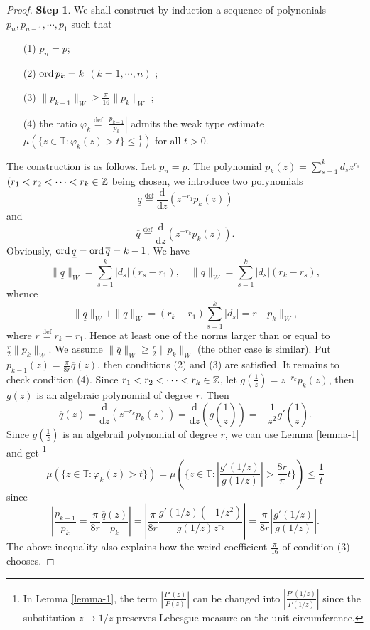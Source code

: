 \begin{proof}
 
  \textbf{Step 1}. We shall construct by induction a sequence of polynonials $p_n,p_{n-1},\cdots,p_1$ such that
  \begin{itemize}
    \item [(1)] $p_n=p$;
    \item [(2)]  $\operatorname{ord} p_k=k$ $ (k=1,\cdots,n)$ ;
    \item [(3)] $\|p_{k-1}\|_{W}\ge \frac{\pi}{16}\|p_k\|_{W}$ ;
    \item [(4)] the ratio $\varphi_k\overset{\mathrm{def}}{=}\left| \frac{p_{k-1}}{p_k} \right| $ admits the weak type estimate $\mu\left( \{z\in \mathbb{T}:\varphi_k(z)>t\} \le \frac{1}{t} \right) $ for all $t>0$.
  \end{itemize}
  The construction is as follows. Let $p_n=p$. The polynomial $p_k(z)=\sum_{s=1}^{k}d_sz^{r_s}$ $(r_1<r_2<\cdots<r_k\in \mathbb{Z}$ being chosen, we introduce two polynomials
  \[
    \underline{q}\overset{\mathrm{def}}{=} \frac{\mathrm{d}}{\mathrm{d}z}\left( z^{-r_1}p_k(z) \right) 		  
  \] 
  and
  \[
    \overline{q}\overset{\mathrm{def}}{=} \frac{\mathrm{d}}{\mathrm{d}z}\left( z^{-r_k}p_k(z) \right). 
  \] 
  Obviously, $\operatorname{ord} \underline{q}=\operatorname{ord} \overline{q}=k-1$. We have 
  \[
    \|\underline{q}\|_{W}=\sum_{s=1}^{k} \left| d_s \right| \left( r_s-r_1 \right) ,\quad \|\overline{q}\|_{W}=\sum_{s=1}^{k} \left| d_s \right| \left( r_k-r_s \right), 
  \] 
  whence
  \[
    \|\underline{q}\|_{W}+\|\overline{q}\|_{W}=\left( r_k-r_1 \right) \sum_{s=1}^{k} \left| d_s \right| =r\|p_k\|_{W},
  \] 
  where $r\overset{\mathrm{def}}{=}r_k-r_1$. Hence at least one of the norms larger than or equal to $\frac{r}{2}\|p_k\|_{W}$. We assume $\|\overline{q}\|_{W}\ge \frac{r}{2}\|p_k\|_{W}$ (the other case is similar). Put $p_{k-1}(z)=\frac{\pi}{8r}\overline{q}(z)$, then conditions (2) and (3) are satisfied. It remains to check condition (4). Since $r_1<r_2<\cdots<r_k\in \mathbb{Z}$, let $g(\frac{1}{z})=z^{-r_k}p_k(z)$, then $g(z)$ is an algebraic polynomial of degree $r$. Then
   \[
     \overline{q}(z)= \frac{\mathrm{d}}{\mathrm{d}z}\left( z^{-r_k}p_k(z) \right) = \frac{\mathrm{d}}{\mathrm{d}z}\left( g\left( \frac{1}{z} \right)  \right)=-\frac{1}{z^2}g'\left( \frac{1}{z} \right).	
\] 
Since $g\left( \frac{1}{z} \right) $ is an algebrail polynomial of degree $r$, we can use  Lemma \ref{lemma-1} and get \footnote{In Lemma \ref{lemma-1}, the term $\left| \frac{P'(z)}{P(z)} \right|$ can be changed into $\left| \frac{P'(1 /z)}{P(1 /z)} \right| $ since the substitution $z\mapsto 1 /z$ preserves Lebesgue measure on the unit circumference.  }
\begin{equation*}
    \mu \left( \{z\in \mathbb{T}:\varphi_{k}(z)>t\}  \right) = \mu \left( \{z\in \mathbb{T}:\left| \frac{g'(1 /z)}{g(1 /z)} \right| >\frac{8r}{\pi}t\}  \right) \le \frac{1}{t} 
\end{equation*} 
since 
$$\left|\frac{p_{k-1}}{p_k}=\frac{\pi}{8r} \frac{\overline{q}(z)}{p_k}\right|=\left|\frac{\pi}{8r} \frac{g'(1 /z)(-1 /z^2)}{g(1 /z)z^{r_k}}\right|=\frac{\pi}{8r}\left| \frac{g'(1 /z)}{g(1 /z)} \right|. 
$$
The above inequality also explains how the weird coefficient $\frac{\pi}{16}$ of condition (3) chooses.


\end{proof}
